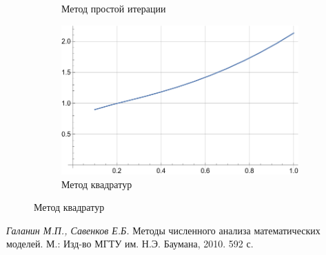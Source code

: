 \documentclass[12pt, a4paper]{article}
\begin{document}
\begin{enumerate}
\begin{enumerate}
\begin{figure}[H]
\begin{subfigure}[b]{0.45\textwidth}
			\caption{Метод простой итерации}
		\end{subfigure}
		\hfill
		\begin{subfigure}[b]{0.45\textwidth}
			\centering
			\includegraphics[width=\textwidth]{task1_2_2_quadro}
			\caption{Метод квадратур}
		\end{subfigure}
	\end{figure}
\end{enumerate}
	\end{enumerate}
	
	
	
	
	
	\newpage
	\begin{thebibliography}{1}
		 \textit{Галанин М.П., Савенков Е.Б.} Методы численного анализа математических\\ моделей. М.: Изд-во МГТУ им. Н.Э. Баумана,	2010. 592 с.
		
		
	\end{thebibliography}
	
	
\end{document}
